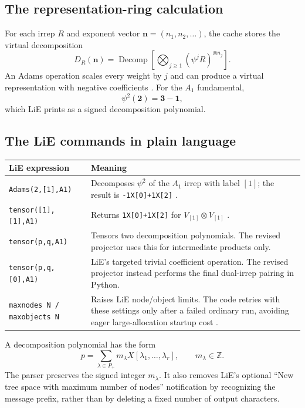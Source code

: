 \documentclass[11pt,a4paper]{article}
\newcommand{\code}[1]{{\small\nolinkurl{#1}}}
\begin{document}
\subsection{The representation-ring calculation}
For each irrep $R$ and exponent vector $\mathbf n=(n_1,n_2,\ldots)$, the cache
stores the virtual decomposition
\begin{equation}
 D_R(\mathbf n)=\operatorname{Decomp}\left[\bigotimes_{j\geq1}
 (\psi^jR)^{\otimes n_j}\right].
\end{equation}
An Adams operation scales every weight by $j$ and can produce a virtual
representation with negative coefficients \cite[Secs.~3.4, 4.5]{lie}. For the
$A_1$ fundamental,
\begin{equation}
 \psi^2(\mathbf2)=\mathbf3-\mathbf1,
\end{equation}
which LiE prints as a signed decomposition polynomial.

\subsection{The LiE commands in plain language}
\begin{tabularx}{\textwidth}{@{}p{57mm}Y@{}}
\toprule LiE expression & Meaning\\\midrule
\code{Adams(2,[1],A1)} & Decomposes $\psi^2$ of the $A_1$ irrep with label
$[1]$; the result is \code{-1X[0]+1X[2]} \cite[Sec.~4.5]{lie}.\\
\code{tensor([1],[1],A1)} & Returns \code{1X[0]+1X[2]} for
$V_{[1]}\otimes V_{[1]}$ \cite[Sec.~4.5]{lie}.\\
\code{tensor(p,q,A1)} & Tensors two decomposition polynomials. The revised
projector uses this for intermediate products only.\\
\code{tensor(p,q,[0],A1)} & LiE's targeted trivial coefficient operation.
The revised projector instead performs the final dual-irrep pairing in Python.\\
\code{maxnodes N / maxobjects N} & Raises LiE node/object limits. The code
retries with these settings only after a failed ordinary run, avoiding eager
large-allocation startup cost \cite[Sec.~2.3]{lie}.\\\bottomrule
\end{tabularx}
A decomposition polynomial has the form
\begin{equation}
 p=\sum_{\lambda\in P_+}m_\lambda X[\lambda_1,\ldots,\lambda_r],\qquad m_\lambda\in\mathbb Z.
\end{equation}
The parser preserves the signed integer $m_\lambda$. It also removes LiE's
optional ``New tree space with maximum number of nodes'' notification by
recognizing the message prefix, rather than by deleting a fixed number of output characters.
\end{document}
